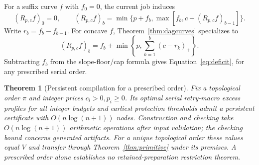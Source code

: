 \documentclass[acmsmall,screen,review,anonymous]{acmart}
\newtheorem{theorem}{Theorem}
\newcommand{\pos}[1]{\left(#1\right)_{+}}
\begin{document}
For a suffix curve $f$ with $f_0=0$, the current job induces
\begin{equation}
 (R_{p,c}f)_0=0,\qquad
 (R_{p,c}f)_b=\min\{p+f_b,\max[f_b,c+(R_{p,c}f)_{b-1}]\}.
 \label{eq:operator}
\end{equation}
Write $r_b=f_b-f_{b-1}$. For concave $f$, Theorem~\ref{thm:dagcurves} specializes to
\begin{equation}
 (R_{p,c}f)_b=f_b+\min\left\{p,\sum_{k=1}^b\pos{c-r_k}\right\}.
 \label{eq:deficit}
\end{equation}
Subtracting $f_b$ from the slope-floor/cap formula gives Equation~\eqref{eq:deficit}, for any prescribed serial order.

\begin{theorem}[Persistent compilation for a prescribed order]
\label{thm:persistent}
Fix a topological order $\pi$ and integer prices $c_i>0,p_i\ge0$. Its optimal serial retry-macro excess profiles for all integer budgets and earliest protection thresholds admit a persistent certificate with $O(n\log(n+1))$ nodes. Construction and checking take $O(n\log(n+1))$ arithmetic operations after input validation; the checking bound concerns generated artifacts. For a unique topological order these values equal $V$ and transfer through Theorem~\ref{thm:primitive} under its premises. A prescribed order alone establishes no retained-preparation restriction theorem.
\end{theorem}
\end{document}
